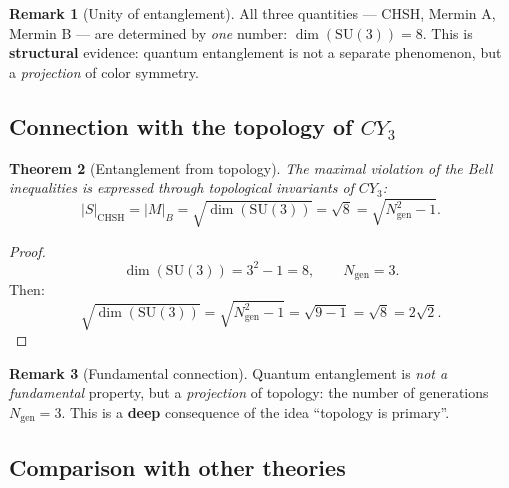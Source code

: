 \documentclass[11pt,a4paper]{article}
\newcommand{\SU}{\mathrm{SU}}
\newcommand{\CY}{CY_3}
\newtheorem{theorem}{Theorem}[section]
\theoremstyle{definition}
\newtheorem{remark}[theorem]{Remark}
\begin{document}
\begin{remark}[Unity of entanglement]
\label{rem:entanglement-unity}
All three quantities — CHSH, Mermin A, Mermin B — are determined 
by \emph{one} number: $\dim(\SU(3)) = 8$. This is 
\textbf{structural} evidence: quantum entanglement is 
not a separate phenomenon, but a \emph{projection} of color symmetry.
\end{remark}

\subsection{Connection with the topology of $\CY$}
\label{subsec:entanglement-topology}

\begin{theorem}[Entanglement from topology]
\label{thm:entanglement-topology}
The maximal violation of the Bell inequalities is expressed through 
topological invariants of $\CY$:
\begin{equation}
    \boxed{
    |S|_{\text{CHSH}} = |M|_B = \sqrt{\dim(\SU(3))} 
    = \sqrt{8} = \sqrt{N_{\text{gen}}^2 - 1}.
    }
    \label{eq:entanglement-topology}
\end{equation}
\end{theorem}

\begin{proof}
\begin{equation}
    \dim(\SU(3)) = 3^2 - 1 = 8, \qquad 
    N_{\text{gen}} = 3.
\end{equation}
Then:
\begin{equation}
    \sqrt{\dim(\SU(3))} = \sqrt{N_{\text{gen}}^2 - 1} 
    = \sqrt{9 - 1} = \sqrt{8} = 2\sqrt{2}.
\end{equation}
\end{proof}

\begin{remark}[Fundamental connection]
\label{rem:entanglement-fundamental}
Quantum entanglement is \emph{not a fundamental} property, 
but a \emph{projection} of topology: the number of generations $N_{\text{gen}} = 3$. 
This is a \textbf{deep} consequence of the idea ``topology is primary''.
\end{remark}

\subsection{Comparison with other theories}
\label{subsec:entanglement-comparison}
\end{document}
